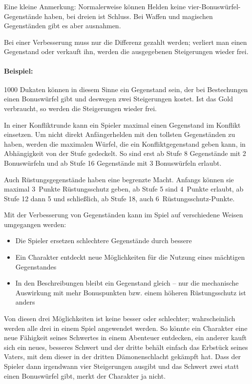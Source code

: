 \BN
Eine kleine Anmerkung: Normalerweise können Helden keine vier-Bonuswürfel-Gegenstände haben, bei dreien ist Schluss. Bei Waffen und magischen Gegenständen gibt es aber ausnahmen.
\EN

Bei einer Verbesserung muss nur die Differenz gezahlt werden; verliert man einen Gegenstand oder verkauft ihn, werden die ausgegebenen Steigerungen wieder frei.

\begin{beispiel}
\paragraph{Beispiel:} 1000 Dukaten können in diesem Sinne ein Gegenstand sein, der bei Bestechungen einen Bonuswürfel gibt und deswegen zwei Steigerungen kostet. Ist das Gold verbraucht, so werden die Steigerungen wieder frei.
\end{beispiel}

In einer Konfliktrunde kann ein Spieler maximal einen Gegenstand im Konflikt einsetzen. Um nicht direkt Anfängerhelden mit den tollsten Gegenständen zu haben, werden die maximalen Würfel, die ein Konfliktgegenstand geben kann, in Abhängigkeit von der Stufe gedeckelt. So sind erst ab Stufe 8 Gegenstände mit 2 Bonuswürfeln und ab Stufe 16 Gegenstände mit 3 Bonuswürfeln erlaubt.

Auch Rüstungsgegenstände haben eine begrenzte Macht. Anfangs können sie maximal 3~Punkte Rüstungsschutz geben, ab Stufe 5 sind 4~Punkte erlaubt, ab Stufe 12 dann 5 und schließlich, ab Stufe 18, auch 6~Rüstungsschutz-Punkte.

Mit der Verbesserung von Gegenständen kann im Spiel auf verschiedene Weisen umgegangen werden:
\begin{itemize}
\item Die Spieler ersetzen schlechtere Gegenstände durch bessere
\item Ein Charakter entdeckt neue Möglichkeiten für die Nutzung eines mächtigen Gegenstandes
\item In den Beschreibungen bleibt ein Gegenstand gleich -- nur die mechanische Auswirkung mit mehr Bonuspunkten bzw. einem höheren Rüstungsschutz ist anders
\end{itemize}
Von diesen drei Möglichkeiten ist keine besser oder schlechter; wahrscheinlich werden alle drei in einem Spiel angewendet werden. So könnte ein Charakter eine neue Fähigkeit seines Schwertes in einem Abenteuer entdecken, ein anderer kauft sich ein neues, besseres Schwert und der dritte behält einfach das Erbstück seines Vaters, mit dem dieser in der dritten Dämonenschlacht gekämpft hat. Dass der Spieler dann irgendwann vier Steigerungen ausgibt und das Schwert zwei statt einen Bonuswürfel gibt, merkt der Charakter ja nicht.

